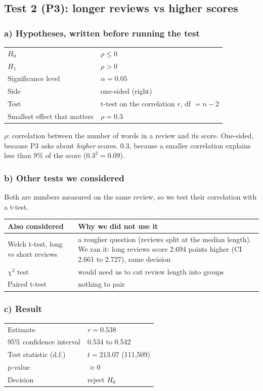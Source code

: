 \documentclass[10pt,a4paper,twocolumn]{article}
\begin{document}
\subsection*{Test 2 (P3): longer reviews vs higher scores}

\subsubsection*{a) Hypotheses, written before running the test}
{\small
\begin{tabularx}{\columnwidth}{@{}HL@{}}
\toprule
$H_0$ & $\rho \leq 0$\\
$H_1$ & $\rho > 0$\\
Significance level & $\alpha = 0.05$\\
Side & one-sided (right)\\
Test & t-test on the correlation $r$, df $= n - 2$\\
Smallest effect that matters & $\rho = 0.3$\\
\bottomrule
\end{tabularx}\par}

$\rho$: correlation between the number of words in a review and its score. One-sided, because P3 asks about
\emph{higher} scores. 0.3, because a smaller correlation explains less than 9\% of the score ($0.3^2 = 0.09$).

\subsubsection*{b) Other tests we considered}
Both are numbers measured on the same review, so we test their correlation with a t-test.

{\footnotesize
\begin{tabularx}{\columnwidth}{@{}P{23mm}L@{}}
\toprule
\textbf{Also considered} & \textbf{Why we did not use it}\\
\midrule
Welch t-test, long vs short reviews & a rougher question (reviews split at the median length). We ran it: long reviews
score 2.694 points higher (CI 2.661 to 2.727), same decision\\
$\chi^2$ test & would need us to cut review length into groups\\
Paired t-test & nothing to pair\\
\bottomrule
\end{tabularx}\par}

\subsubsection*{c) Result}
{\small
\begin{tabularx}{\columnwidth}{@{}HL@{}}
\toprule
Estimate & $r = 0.538$\\
95\% confidence interval & 0.534 to 0.542\\
Test statistic (d.f.) & $t = 213.07$ (111,509)\\
p-value & $\approx 0$\\
Decision & reject $H_0$\\
\bottomrule
\end{tabularx}\par}
\end{document}
